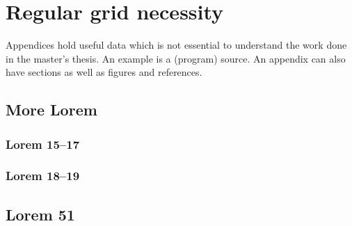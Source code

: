 \chapter{Regular grid necessity}
\label{app:C}
Appendices hold useful data which is not essential to understand the work
done in the master's thesis. An example is a (program) source.
An appendix can also have sections as well as figures and references\cite{h2g2}.

\section{More Lorem}
\lipsum[50]

\subsection{Lorem 15--17}
\lipsum[15-17]

\subsection{Lorem 18--19}
\lipsum[18-19]

\section{Lorem 51}
\lipsum[51]

